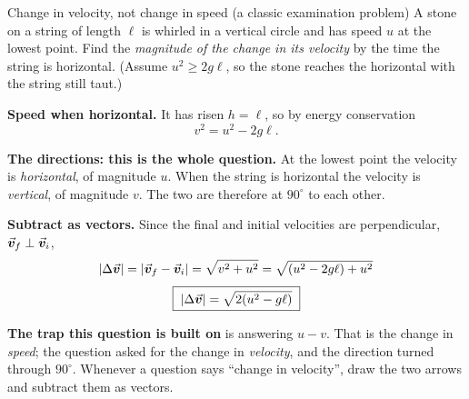 \begin{exbox}{Change in velocity, not change in speed \textnormal{(a classic examination problem)}}
A stone on a string of length $\ell$ is whirled in a vertical circle and has speed $u$ at the lowest point.
Find the \emph{magnitude of the change in its velocity} by the time the string is horizontal. (Assume
$u^{2}\ge2g\ell$, so the stone reaches the horizontal with the string still taut.)

 \textbf{Speed when horizontal.} It has risen $h=\ell$, so by energy conservation
\[
v^{2}=u^{2}-2g\ell.
\]

 \textbf{The directions: this is the whole question.} At the lowest point the velocity is
\emph{horizontal}, of magnitude $u$. When the string is horizontal the velocity is \emph{vertical}, of
magnitude $v$. The two are therefore at $90^\circ$ to each other.

 \textbf{Subtract as vectors.} Since the final and initial velocities are perpendicular, $\vec{\bm{v}}_f\perp\vec{\bm{v}}_i$,
\[
|\Delta\vec{\bm{v}}|=|\vec{\bm{v}}_f-\vec{\bm{v}}_i|=\sqrt{v^{2}+u^{2}}=\sqrt{(u^{2}-2g\ell)+u^{2}}
\]
\[
\boxed{\;|\Delta\vec{\bm{v}}|=\sqrt{2(u^{2}-g\ell)}\;}
\]

\smallskip
\textbf{The trap this question is built on} is answering $u-v$. That is the change in \emph{speed}; the
question asked for the change in \emph{velocity}, and the direction turned through $90^\circ$. Whenever
a question says ``change in velocity'', draw the two arrows and subtract them as vectors.
\end{exbox}

\begin{figure}[htbp]
\centering
{}
\end{figure}


